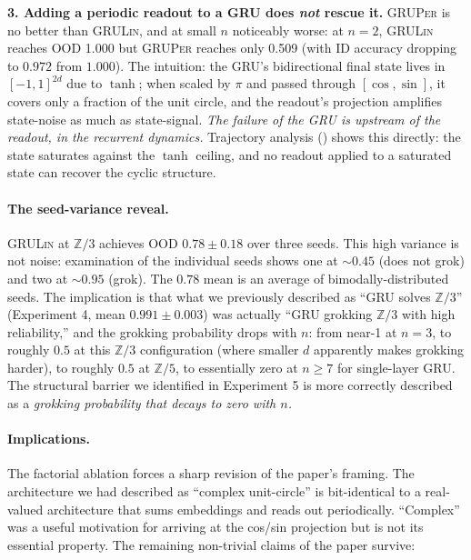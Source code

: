 \documentclass[11pt]{article}
\theoremstyle{definition}
\newcommand{\Z}{\mathbb{Z}}
\begin{document}
\textbf{3. Adding a periodic readout to a GRU does \emph{not}
rescue it.} \textsc{GRUPer} is no better than \textsc{GRULin}, and
at small $n$ noticeably worse: at $n=2$, \textsc{GRULin} reaches
OOD 1.000 but \textsc{GRUPer} reaches only 0.509 (with ID accuracy
dropping to $0.972$ from $1.000$). The intuition: the GRU's
bidirectional final state lives in $[-1, 1]^{2d}$ due to $\tanh$;
when scaled by $\pi$ and passed through $[\cos, \sin]$, it covers
only a fraction of the unit circle, and the readout's projection
amplifies state-noise as much as state-signal. \emph{The failure
of the GRU is upstream of the readout, in the recurrent dynamics.}
Trajectory analysis () shows this directly:
the state saturates against the $\tanh$ ceiling, and no readout
applied to a saturated state can recover the cyclic structure.

\paragraph{The seed-variance reveal.} \textsc{GRULin} at $\Z/3$
achieves OOD $0.78 \pm 0.18$ over three seeds. This high variance
is not noise: examination of the individual seeds shows one at
$\sim 0.45$ (does not grok) and two at $\sim 0.95$ (grok). The
$0.78$ mean is an average of bimodally-distributed seeds. The
implication is that what we previously described as ``GRU solves
$\Z/3$'' (Experiment 4, mean $0.991 \pm 0.003$) was actually
``GRU grokking $\Z/3$ with high reliability,'' and the grokking
probability drops with $n$: from near-1 at $n=3$, to roughly $0.5$
at this $\Z/3$ configuration (where smaller $d$ apparently makes
grokking harder), to roughly $0.5$ at $\Z/5$, to essentially zero
at $n \geq 7$ for single-layer GRU. The structural barrier we
identified in Experiment 5 is more correctly described as a
\emph{grokking probability that decays to zero with $n$.}

\paragraph{Implications.} The factorial ablation forces a sharp
revision of the paper's framing. The architecture we had described
as ``complex unit-circle'' is bit-identical to a real-valued
architecture that sums embeddings and reads out periodically.
``Complex'' was a useful motivation for arriving at the cos/sin
projection but is not its essential property. The remaining
non-trivial claims of the paper survive:
\end{document}
